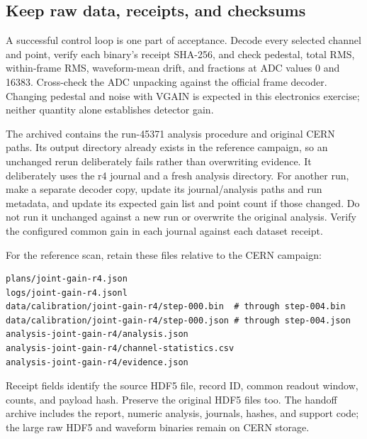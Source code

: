\documentclass[10pt,a4paper]{article}
\begin{document}
\subsection{Keep raw data, receipts, and checksums}
A successful control loop is one part of acceptance. Decode every selected channel and point, verify each binary's receipt SHA-256, and check pedestal, total RMS, within-frame RMS, waveform-mean drift, and fractions at ADC values 0 and 16383. Cross-check the ADC unpacking against the official frame decoder. Changing pedestal and noise with VGAIN is expected in this electronics exercise; neither quantity alone establishes detector gain.

The archived  contains the run-45371 analysis procedure and original CERN paths. Its output directory already exists in the reference campaign, so an unchanged rerun deliberately fails rather than overwriting evidence. It deliberately uses the r4 journal and a fresh analysis directory. For another run, make a separate decoder copy, update its journal/analysis paths and run metadata, and update its expected gain list and point count if those changed. Do not run it unchanged against a new run or overwrite the original analysis. Verify the configured common gain in each journal against each dataset receipt.

For the reference scan, retain these files relative to the CERN campaign:
\begin{lstlisting}
plans/joint-gain-r4.json
logs/joint-gain-r4.jsonl
data/calibration/joint-gain-r4/step-000.bin  # through step-004.bin
data/calibration/joint-gain-r4/step-000.json # through step-004.json
analysis-joint-gain-r4/analysis.json
analysis-joint-gain-r4/channel-statistics.csv
analysis-joint-gain-r4/evidence.json
\end{lstlisting}
Receipt fields identify the source HDF5 file, record ID, common readout window, counts, and payload hash. Preserve the original HDF5 files too. The handoff archive includes the report, numeric analysis, journals, hashes, and support code; the large raw HDF5 and waveform binaries remain on CERN storage.
\end{document}
